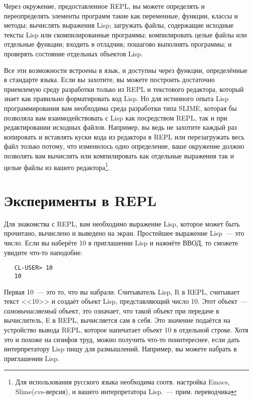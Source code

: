 Через окружение, предоставленное REPL, вы можете определять и переопределять элементы
программ такие как переменные, функции, классы и методы; вычислять выражения Lisp;
загружать файлы, содержащие исходные тексты Lisp или скомпилированные программы;
компилировать целые файлы или отдельные функции; входить в отладчик; пошагово выполнять
программы; и проверять состояние отдельных объектов Lisp.

Все эти возможности встроены в язык, и доступны через функции, определённые в стандарте
языка. Если вы захотите, вы можете построить достаточно приемлемую среду разработки только
из REPL и текстового редактора, который знает как правильно форматировать код Lisp. Но для
истинного опыта Lisp программирования вам необходима среда разработки типа SLIME, которая
бы позволяла вам взаимодействовать с Lisp как посредством REPL, так и при редактировании
исходных файлов. Например, вы ведь не захотите каждый раз копировать и вставлять куски
кода из редактора в REPL или перезагружать весь файл только потому, что изменилось одно
определение, ваше окружение должно позволять вам вычислять или компилировать как отдельные
выражения так и целые файлы из вашего редактора\footnote{Для использования русского языка
  необходима соотв. настройка Emacs, Slime(cvs-версия), и вашего интерпретатора Lisp.~---
  прим. переводчика}.

\section{Эксперименты в REPL}

Для знакомства с REPL, вам необходимо выражение Lisp, которое может быть прочитано,
вычислено и выведено на экран. Простейшее выражение Lisp~--- это число. Если вы наберёте
10 в приглашении Lisp и нажмёте ВВОД, то сможете увидите что-то наподобие:

\begin{verbatim}
   CL-USER> 10
   10
\end{verbatim}

Первая 10~--- это то, что вы набрали. Считыватель Lisp, R в REPL, считывает текст <<10>> и
создаёт объект Lisp, представляющий число 10. Этот объект~--- \emph{самовычисляемый} объект,
это означает, что такой объект при передаче в вычислитель, E в REPL, вычисляется сам в
себя. Это значение подаётся на устройство вывода REPL, которое напечатает объект 10 в
отдельной строке. Хотя это и похоже на сизифов труд, можно получить что-то поинтереснее,
если дать интерпретатору Lisp пищу для размышлений. Например, вы можете набрать  в
приглашении Lisp.

